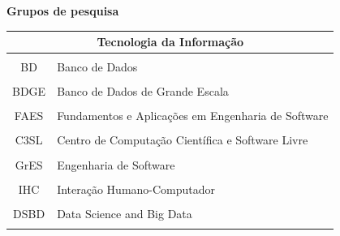 \documentclass[10pt,
  aspectratio=169,
  serif,
  mathserif,
  professionalfont,
  compress,
  handout,
  ]{beamer}\usepackage[]{graphicx}\usepackage[]{color}
\begin{document}
\begin{frame}[c, allowframebreaks]
  
  \textbf{Grupos de pesquisa}
  
\begin{table}[]
\begin{tabular}{cl}
\hline
\multicolumn{2}{c}{Tecnologia da Informação}              \\ \hline
                     &                                                                     \\
BD   & Banco de Dados                                     \\
     &                                                    \\
BDGE & Banco de Dados de Grande Escala                    \\
     &                                                    \\
FAES & Fundamentos e Aplicações em Engenharia de Software \\
     &                                                    \\
C3SL & Centro de Computação Científica e Software Livre   \\
     &                                                    \\
GrES & Engenharia de Software                             \\
     &                                                    \\
IHC  & Interação Humano-Computador                        \\
     &                                                    \\
DSBD & Data Science and Big Data                          \\ 
                     &                                                                     \\
                     \hline
\end{tabular}
\label{tab:my-table}
\end{table}

\end{frame}
\end{document}
